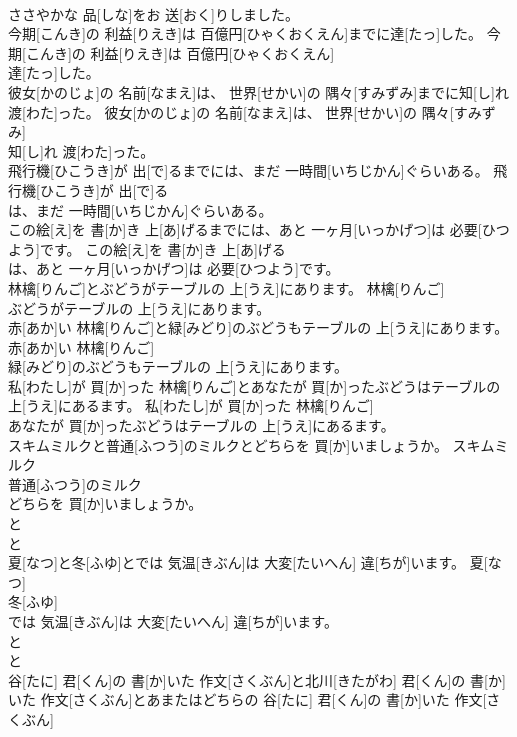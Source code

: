 \documentclass[8pt]{extreport}
\begin{document}
\begin{CJK}{UTF8}{min}
\\	ささやかな 品[しな]をお 送[おく]りしました。	
\\	今期[こんき]の 利益[りえき]は 百億円[ひゃくおくえん]までに達[たっ]した。	今期[こんき]の 利益[りえき]は 百億円[ひゃくおくえん]
\\	達[たっ]した。	
\\	彼女[かのじょ]の 名前[なまえ]は、 世界[せかい]の 隅々[すみずみ]までに知[し]れ 渡[わた]った。	彼女[かのじょ]の 名前[なまえ]は、 世界[せかい]の 隅々[すみずみ]
\\	知[し]れ 渡[わた]った。	
\\	飛行機[ひこうき]が 出[で]るまでには、まだ 一時間[いちじかん]ぐらいある。	飛行機[ひこうき]が 出[で]る
\\	は、まだ 一時間[いちじかん]ぐらいある。	
\\	この絵[え]を 書[か]き 上[あ]げるまでには、あと 一ヶ月[いっかげつ]は 必要[ひつよう]です。	この絵[え]を 書[か]き 上[あ]げる
\\	は、あと 一ヶ月[いっかげつ]は 必要[ひつよう]です。	
\\	林檎[りんご]とぶどうがテーブルの 上[うえ]にあります。	林檎[りんご]
\\	ぶどうがテーブルの 上[うえ]にあります。	
\\	赤[あか]い 林檎[りんご]と緑[みどり]のぶどうもテーブルの 上[うえ]にあります。	赤[あか]い 林檎[りんご]
\\	緑[みどり]のぶどうもテーブルの 上[うえ]にあります。	
\\	私[わたし]が 買[か]った 林檎[りんご]とあなたが 買[か]ったぶどうはテーブルの 上[うえ]にあるます。	私[わたし]が 買[か]った 林檎[りんご]
\\	あなたが 買[か]ったぶどうはテーブルの 上[うえ]にあるます。	
\\	スキムミルクと普通[ふつう]のミルクとどちらを 買[か]いましょうか。	スキムミルク
\\	普通[ふつう]のミルク
\\	どちらを 買[か]いましょうか。	
\\	と 
\\	と 
\\	夏[なつ]と冬[ふゆ]とでは 気温[きぶん]は 大変[たいへん] 違[ちが]います。	夏[なつ]
\\	冬[ふゆ]
\\	では 気温[きぶん]は 大変[たいへん] 違[ちが]います。	
\\	と 
\\	と 
\\	谷[たに] 君[くん]の 書[か]いた 作文[さくぶん]と北川[きたがわ] 君[くん]の 書[か]いた 作文[さくぶん]とあまたはどちらの	谷[たに] 君[くん]の 書[か]いた 作文[さくぶん]

\end{CJK}
\end{document}
